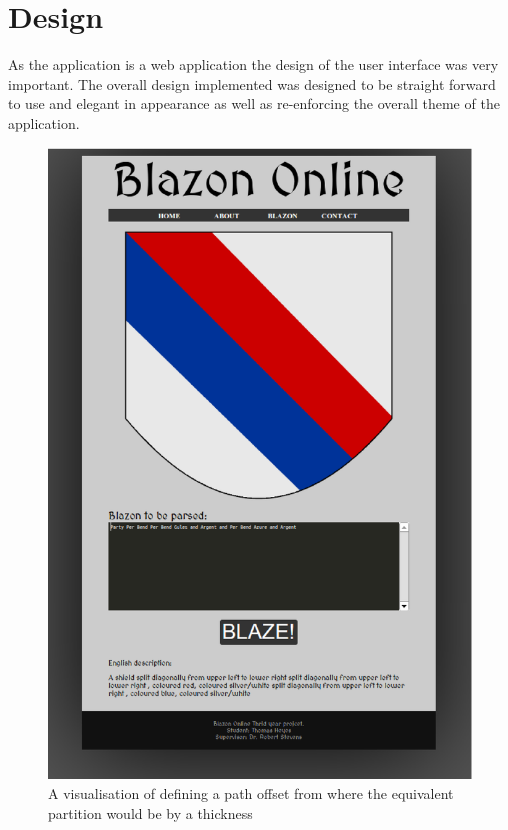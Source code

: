 \chapter{Design}

As the application is a web application the design of the user interface was very important.  The overall design implemented was designed to be straight forward to use and elegant in appearance as well as re-enforcing the overall theme of the application.  

\begin{figure}[H]
  \centering
    \includegraphics[width=\textwidth]{design/images/overall.eps}
  \caption{A visualisation of defining a path offset from where the equivalent partition would be by a thickness}
  \label{fig:overall}
  
\end{figure}
